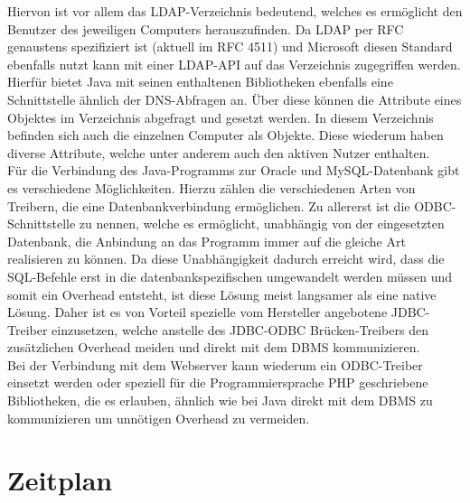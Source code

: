 Hiervon ist vor allem das LDAP-Verzeichnis bedeutend, welches es ermöglicht den Benutzer des jeweiligen Computers herauszufinden.
Da LDAP per RFC genaustens spezifiziert ist (aktuell im RFC 4511) und Microsoft diesen Standard ebenfalls nutzt kann mit einer LDAP-API auf das Verzeichnis zugegriffen werden.\\
Hierfür bietet Java mit seinen enthaltenen Bibliotheken ebenfalls eine Schnittstelle ähnlich der DNS-Abfragen an. Über diese können die Attribute eines Objektes im Verzeichnis abgefragt und gesetzt werden. In diesem Verzeichnis befinden sich auch die einzelnen Computer als Objekte. Diese wiederum haben diverse Attribute, welche unter anderem auch den aktiven Nutzer enthalten.\\
Für die Verbindung des Java-Programms zur Oracle und MySQL-Datenbank gibt es verschiedene Möglichkeiten. Hierzu zählen die verschiedenen Arten von Treibern, die eine Datenbankverbindung ermöglichen. Zu allererst ist die ODBC-Schnittstelle zu nennen, welche es ermöglicht, unabhängig von der eingesetzten Datenbank, die Anbindung an das Programm immer auf die gleiche Art realisieren zu können.
Da diese Unabhängigkeit dadurch erreicht wird, dass die SQL-Befehle erst in die datenbankspezifischen umgewandelt werden müssen und somit ein Overhead entsteht, ist diese Lösung meist langsamer als eine native Lösung. Daher ist es von Vorteil spezielle vom Hersteller angebotene JDBC-Treiber einzusetzen, welche anstelle des JDBC-ODBC Brücken-Treibers den zusätzlichen Overhead meiden und direkt mit dem DBMS kommunizieren.\\
Bei der Verbindung mit dem Webserver kann wiederum ein ODBC-Treiber einsetzt werden oder speziell für die Programmiersprache PHP geschriebene Bibliotheken, die es erlauben, ähnlich wie bei Java direkt mit dem DBMS zu kommunizieren um unnötigen Overhead zu vermeiden.\\

\section{Zeitplan}
\label{sec:timetable}

